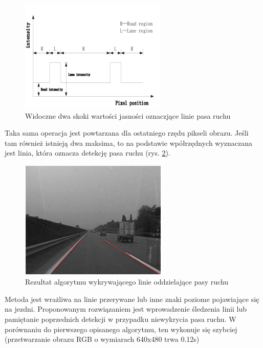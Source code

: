 \begin{figure}
  \centering
  \includegraphics[width=7cm]{img/lane_detection2_intensity.png}
  \caption{Widoczne dwa skoki wartości jasności oznaczjące linie pasa ruchu\cite{T6}}
  \label{fig:lane_detection2_intensity}
\end{figure}
Taka sama operacja jest powtarzana dla ostatniego rzędu pikseli obrazu. Jeśli tam również istnieją dwa maksima, to na podstawie wpółrzędnych wyznaczana jest linia, która oznacza detekcję pasa ruchu (rys. \ref{fig:lane_detection2_result}).

\begin{figure}
  \centering
  \includegraphics[width=7cm]{img/lane_detection2_result.png}
  \caption{Rezultat algorytmu wykrywającego linie oddzielające pasy ruchu\cite{T6}}
  \label{fig:lane_detection2_result}
\end{figure}

Metoda jest wrażliwa na linie przerywane lub inne znaki poziome pojawiające się na jezdni. Proponowanym rozwiązaniem jest wprowadzenie śledzenia linii lub pamiętanie poprzednich detekcji w przypadku niewykrycia pasa ruchu.
W porównaniu do pierwszego opisanego algorytmu, ten wykonuje się szybciej (przetwarzanie obrazu RGB o wymiarach 640x480 trwa 0.12s)

